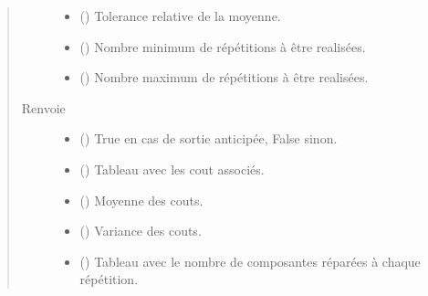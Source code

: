 \documentclass[letterpaper,10pt,french]{sphinxmanual}
\begin{document}
\begin{fulllineitems}
\begin{fulllineitems}
\begin{quote}
\begin{description}
\begin{itemize}
\item {} 
 () \textendash{} Tolerance relative de la moyenne.

\item {} 
 () \textendash{} Nombre minimum de répétitions à être realisées.

\item {} 
 () \textendash{} Nombre maximum de répétitions à être realisées.

\end{itemize}

\item[{Renvoie}] \leavevmode
\begin{itemize}
\item {} 
 () \textendash{} True en cas de sortie anticipée, False sinon.

\item {} 
 () \textendash{} Tableau avec les cout associés.

\item {} 
 () \textendash{} Moyenne des couts.

\item {} 
 () \textendash{} Variance des couts.

\item {} 
 () \textendash{} Tableau avec le nombre de composantes réparées à chaque répétition.

\end{itemize}


\end{description}\end{quote}

\end{fulllineitems}


\end{fulllineitems}

\end{document}
